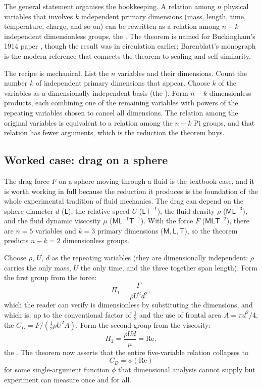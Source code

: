 The general statement organises the bookkeeping. A relation among $n$
physical variables that involves $k$ independent primary dimensions
(mass, length, time, temperature, charge, and so on) can be rewritten
as a relation among $n - k$ independent dimensionless groups, the
. The theorem is named for Buckingham's 1914 paper
\cite{paper:buckingham1914}, though the result was in circulation
earlier; Barenblatt's monograph \cite{text:barenblatt1996} is the
modern reference that connects the theorem to scaling and
self-similarity.

The recipe is mechanical. List the $n$ variables and their dimensions.
Count the number $k$ of independent primary dimensions that appear.
Choose $k$ of the variables as a dimensionally independent basis (the
). Form $n - k$ dimensionless products,
each combining one of the remaining variables with powers of the
repeating variables chosen to cancel all dimensions. The relation among
the original variables is equivalent to a relation among the $n - k$ Pi
groups, and that relation has fewer arguments, which is the reduction
the theorem buys.

\subsection{Worked case: drag on a sphere}

The drag force $F$ on a sphere moving through a fluid is the textbook
case, and it is worth working in full because the reduction it produces
is the foundation of the whole experimental tradition of fluid
mechanics. The drag can depend on the sphere diameter $d$
($\mathsf{L}$), the relative speed $U$ ($\mathsf{L}\mathsf{T}^{-1}$),
the fluid density $\rho$ ($\mathsf{M}\mathsf{L}^{-3}$), and the fluid
dynamic viscosity $\mu$ ($\mathsf{M}\mathsf{L}^{-1}\mathsf{T}^{-1}$).
With the force $F$ ($\mathsf{M}\mathsf{L}\mathsf{T}^{-2}$), there are
$n = 5$ variables and $k = 3$ primary dimensions
($\mathsf{M}, \mathsf{L}, \mathsf{T}$), so the theorem predicts
$n - k = 2$ dimensionless groups.

Choose $\rho$, $U$, $d$ as the repeating variables (they are
dimensionally independent: $\rho$ carries the only mass, $U$ the only
time, and the three together span length). Form the first group from
the force:
\[
\Pi_1 = \frac{F}{\rho U^2 d^2},
\]
which the reader can verify is dimensionless by substituting the
dimensions, and which is, up to the conventional factor of
$\tfrac{1}{2}$ and the use of frontal area $A = \pi d^2/4$, the
 $C_D = F / (\tfrac{1}{2}\rho U^2 A)$. Form
the second group from the viscosity:
\[
\Pi_2 = \frac{\rho U d}{\mu} = \mathrm{Re},
\]
the . The theorem now asserts that the entire
five-variable relation collapses to
\[
C_D = \phi(\mathrm{Re})
\]
for some single-argument function $\phi$ that dimensional analysis
cannot supply but experiment can measure once and for all.

